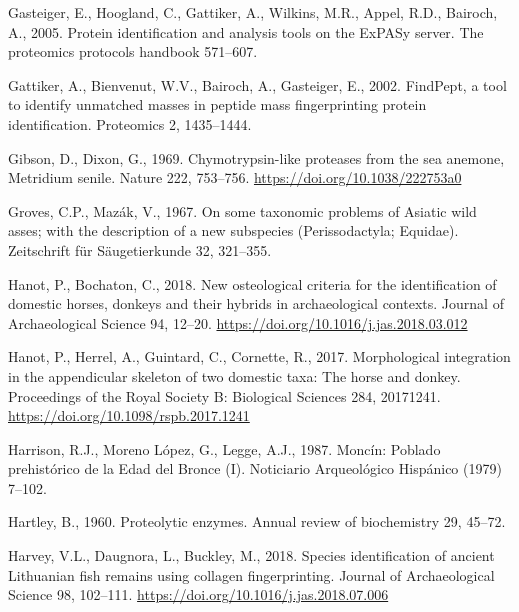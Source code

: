 \documentclass[preprint, 3p, authoryear]{elsarticle} %
\newlength{\cslhangindent}
\newlength{\cslentryspacingunit} %
\newenvironment{CSLReferences}[2] %
 {%
  \setlength{\parindent}{0pt}
  \ifodd #1
  \let\oldpar\par
  \def\par{\hangindent=\cslhangindent\oldpar}
  \fi
  \setlength{\parskip}{#2\cslentryspacingunit}
 }%
 {}
\begin{document}
\begin{CSLReferences}{1}{0}
\leavevmode{}%
Gasteiger, E., Hoogland, C., Gattiker, A., Wilkins, M.R., Appel, R.D., Bairoch, A., 2005. Protein identification and analysis tools on the {ExPASy} server. The proteomics protocols handbook 571--607.

\leavevmode{}%
Gattiker, A., Bienvenut, W.V., Bairoch, A., Gasteiger, E., 2002. {FindPept}, a tool to identify unmatched masses in peptide mass fingerprinting protein identification. Proteomics 2, 1435--1444.

\leavevmode{}%
Gibson, D., Dixon, G., 1969. Chymotrypsin-like proteases from the sea anemone, {Metridium} senile. Nature 222, 753--756. \url{https://doi.org/10.1038/222753a0}

\leavevmode{}%
Groves, C.P., Mazák, V., 1967. On some taxonomic problems of {Asiatic} wild asses; with the description of a new subspecies ({Perissodactyla}; {Equidae}). Zeitschrift für Säugetierkunde 32, 321--355.

\leavevmode{}%
Hanot, P., Bochaton, C., 2018. New osteological criteria for the identification of domestic horses, donkeys and their hybrids in archaeological contexts. Journal of Archaeological Science 94, 12--20. \url{https://doi.org/10.1016/j.jas.2018.03.012}

\leavevmode{}%
Hanot, P., Herrel, A., Guintard, C., Cornette, R., 2017. Morphological integration in the appendicular skeleton of two domestic taxa: The horse and donkey. Proceedings of the Royal Society B: Biological Sciences 284, 20171241. \url{https://doi.org/10.1098/rspb.2017.1241}

\leavevmode{}%
Harrison, R.J., Moreno López, G., Legge, A.J., 1987. Moncín: Poblado prehistórico de la {Edad} del {Bronce} ({I}). Noticiario Arqueológico Hispánico (1979) 7--102.

\leavevmode{}%
Hartley, B., 1960. Proteolytic enzymes. Annual review of biochemistry 29, 45--72.

\leavevmode{}%
Harvey, V.L., Daugnora, L., Buckley, M., 2018. Species identification of ancient {Lithuanian} fish remains using collagen fingerprinting. Journal of Archaeological Science 98, 102--111. \url{https://doi.org/10.1016/j.jas.2018.07.006}


\end{CSLReferences}
\end{document}
